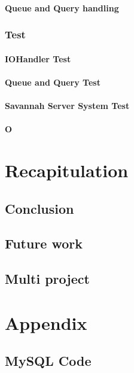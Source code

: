       \subsubsection{Queue and Query handling} %
	\label{QQHandling}
	  
    \subsection{Test}
	
	\subsubsection{IOHandler Test}
	
        \subsubsection{Queue and Query Test}
	
	\subsubsection{Savannah Server System Test}
	
	\subsubsection{O}

\chapter{Recapitulation}
\label{recap}
  \section{Conclusion}
  \section{Future work}
  \section{Multi project} %

\appendix
	\chapter{Appendix}
	\section{MySQL Code}
	\label{MySQLcode}
		
